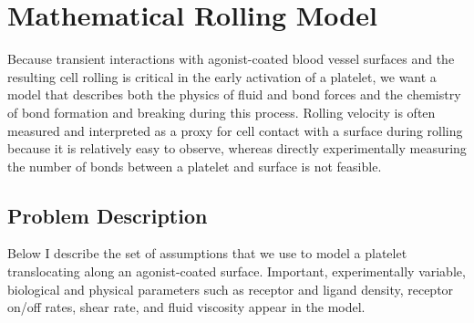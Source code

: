 
\chapter{Mathematical Rolling Model}

Because transient interactions with agonist-coated blood vessel
surfaces and the resulting cell rolling is critical in the early
activation of a platelet, we want a model that describes both the
physics of fluid and bond forces and the chemistry of bond formation
and breaking during this process. Rolling velocity is often measured
and interpreted as a proxy for cell contact with a surface during
rolling because it is relatively easy to observe, whereas directly
experimentally measuring the number of bonds between a platelet and
surface is not feasible. 

\section{Problem Description}
\label{sec:problem-description}

Below I describe the set of assumptions that we use to model a
platelet translocating along an agonist-coated surface. Important,
experimentally variable, biological and physical parameters such as
receptor and ligand density, receptor on/off rates, shear rate, and
fluid viscosity appear in the model.

